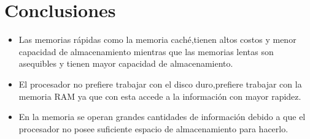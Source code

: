 \documentclass{article}
\begin{document}
\section{Conclusiones}
\begin{itemize}
    \item{Las memorias  rápidas como la memoria caché,tienen altos costos y menor capacidad de almacenamiento mientras que las memorias lentas son asequibles y tienen mayor capacidad de almacenamiento. }
    \item{El procesador no prefiere trabajar con el disco duro,prefiere trabajar con la memoria RAM ya que con esta  accede a la información con mayor rapidez.}
    \item{En la memoria se operan grandes cantidades de información debido a que el procesador no posee suficiente espacio de almacenamiento para hacerlo. }
\end{itemize}




\newpage
    




\end{document}
